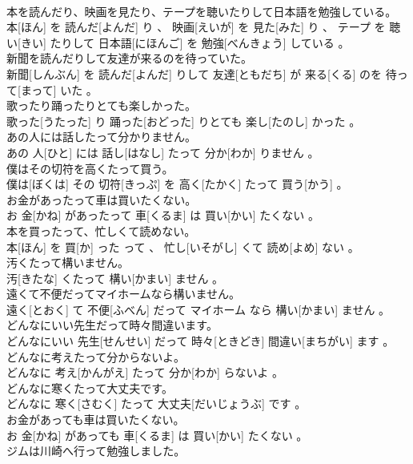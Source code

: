 \documentclass[8pt]{extreport}
\begin{document}
\begin{CJK}{UTF8}{min}
\\	本を読んだり、映画を見たり、テープを聴いたりして日本語を勉強している。	
\\	本[ほん] を 読んだ[よんだ] り 、 映画[えいが] を 見た[みた] り 、 テープ を 聴い[きい] たりして 日本語[にほんご] を 勉強[べんきょう] している 。
\\	新聞を読んだりして友達が来るのを待っていた。	
\\	新聞[しんぶん] を 読んだ[よんだ] りして 友達[ともだち] が 来る[くる] のを 待って[まって] いた 。
\\	歌ったり踊ったりとても楽しかった。	
\\	歌った[うたった] り 踊った[おどった] りとても 楽し[たのし] かった 。
\\	あの人には話したって分かりません。	
\\	あの 人[ひと] には 話し[はなし] たって 分か[わか] りません 。
\\	僕はその切符を高くたって買う。	
\\	僕は[ぼくは] その 切符[きっぷ] を 高く[たかく] たって 買う[かう] 。
\\	お金があったって車は買いたくない。	
\\	お 金[かね] があったって 車[くるま] は 買い[かい] たくない 。
\\	本を買ったって、忙しくて読めない。	
\\	本[ほん] を 買[か] った って 、 忙し[いそがし] くて 読め[よめ] ない 。
\\	汚くたって構いません。	
\\	汚[きたな] くたって 構い[かまい] ません 。
\\	遠くて不便だってマイホームなら構いません。	
\\	遠く[とおく] て 不便[ふべん] だって マイホーム なら 構い[かまい] ません 。
\\	どんなにいい先生だって時々間違います。	
\\	どんなにいい 先生[せんせい] だって 時々[ときどき] 間違い[まちがい] ます 。
\\	どんなに考えたって分からないよ。	
\\	どんなに 考え[かんがえ] たって 分か[わか] らないよ 。
\\	どんなに寒くたって大丈夫です。	
\\	どんなに 寒く[さむく] たって 大丈夫[だいじょうぶ] です 。
\\	お金があっても車は買いたくない。	
\\	お 金[かね] があっても 車[くるま] は 買い[かい] たくない 。
\\	ジムは川崎へ行って勉強しました。	

\end{CJK}
\end{document}
